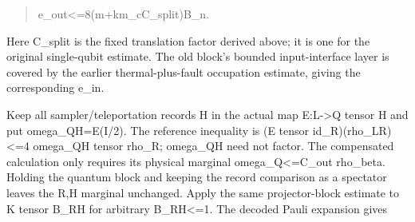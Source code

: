 \documentclass[
]{article}
\begin{document}
\begin{quote}\small\ttfamily\raggedright\setlength{\parskip}{0pt}
\noindent e\allowbreak{}\_\allowbreak{}o\allowbreak{}u\allowbreak{}t\allowbreak{}<\allowbreak{}=\allowbreak{}8\allowbreak{}(\allowbreak{}m\allowbreak{}+\allowbreak{}k\allowbreak{}\hspace*{0.525em}\allowbreak{}m\allowbreak{}\_\allowbreak{}c\allowbreak{}\hspace*{0.525em}\allowbreak{}C\allowbreak{}\_\allowbreak{}s\allowbreak{}p\allowbreak{}l\allowbreak{}i\allowbreak{}t\allowbreak{})\allowbreak{}\hspace*{0.525em}\allowbreak{}B\allowbreak{}\_\allowbreak{}n\allowbreak{}.\par
\end{quote}

Here C\_split is the fixed translation factor derived above; it is one
for the original single-qubit estimate. The old block's bounded
input-interface layer is covered by the earlier thermal-plus-fault
occupation estimate, giving the corresponding e\_in.

Keep all
s\allowbreak{}a\allowbreak{}m\allowbreak{}p\allowbreak{}l\allowbreak{}e\allowbreak{}r\allowbreak{}/\allowbreak{}t\allowbreak{}e\allowbreak{}l\allowbreak{}e\allowbreak{}p\allowbreak{}o\allowbreak{}r\allowbreak{}t\allowbreak{}a\allowbreak{}t\allowbreak{}i\allowbreak{}o\allowbreak{}n
records H in the actual map E:L-\textgreater Q tensor H and put
o\allowbreak{}m\allowbreak{}e\allowbreak{}g\allowbreak{}a\allowbreak{}\_\allowbreak{}Q\allowbreak{}H\allowbreak{}=\allowbreak{}E\allowbreak{}(\allowbreak{}I\allowbreak{}/\allowbreak{}2\allowbreak{})\allowbreak{}.
The reference inequality is (E tensor
i\allowbreak{}d\allowbreak{}\_\allowbreak{}R\allowbreak{})\allowbreak{}(\allowbreak{}r\allowbreak{}h\allowbreak{}o\allowbreak{}\_\allowbreak{}L\allowbreak{}R\allowbreak{})\allowbreak{}<\allowbreak{}=\allowbreak{}4
omega\_QH tensor rho\_R; omega\_QH need not factor. The compensated
calculation only requires its physical marginal omega\_Q\textless=C\_out
rho\_beta. Holding the quantum block and keeping the record comparison
as a spectator leaves the R,H marginal unchanged. Apply the same
projector-block estimate to K tensor B\_RH for arbitrary
\textbar\textbar B\_RH\textbar\textbar\textless=1. The decoded Pauli
expansion gives
\end{document}
